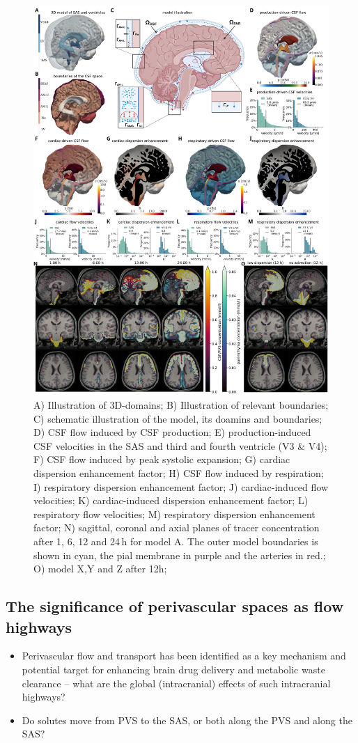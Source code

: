 \documentclass[fleqn,10pt]{wlscirep}
\begin{document}
\begin{figure}[h!]
\centering 
\includegraphics[width = 0.9\linewidth]{figures/figure2.png}
\caption{
A) Illustration of 3D-domains; 
B) Illustration of relevant boundaries; 
C) schematic illustration of the model, its doamins and boundaries; 
D) CSF flow induced by CSF production; 
E) production-induced CSF velocities in the SAS and third and fourth ventricle (V3 \& V4); 
F) CSF flow induced by peak systolic expansion; 
G) cardiac dispersion enhancement factor;
H) CSF flow induced by respiration; 
I) respiratory dispersion enhancement factor;
J) cardiac-induced flow velocities;
K) cardiac-induced dispersion enhancement factor;
L) respiratory flow velocities;
M) respiratory dispersion enhancement factor;
N) sagittal, coronal and axial planes of tracer concentration after 1, 6, 12 and 24$\,$h for model A. The outer model boundaries is shown in cyan, the pial membrane in purple and the arteries in red.;
O) model X,Y and Z after 12h;
}
\label{fig:csf}
\end{figure}  

\subsection*{The significance of perivascular spaces as flow highways}
\begin{itemize}
\item
  Perivascular flow and transport has been identified as a key
  mechanism and potential target for enhancing brain drug delivery and
  metabolic waste clearance -- what are the global (intracranial)
  effects of such intracranial highways? 
\item
  Do solutes move from PVS to the SAS, or both along the PVS and along
  the SAS?
\end{itemize}
\end{document}

